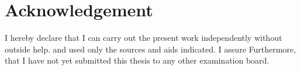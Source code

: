 
\thispagestyle{empty}
\chapter*{Acknowledgement}
I hereby declare that I can carry out the present work independently without outside help.
and used only the sources and aids indicated. I assure
Furthermore, that I have not yet submitted this thesis to any other examination board.



\vspace{5em}
